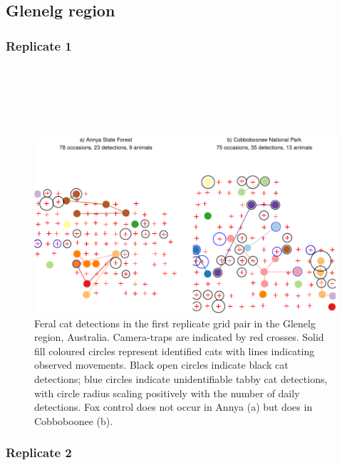 \documentclass[11pt,a4paper,titlepage,twoside,openright]{style/unimelbthesis}
\begin{document}
\begin{mainmatter}
\hypertarget{glenelg-region}{%
\subsection{Glenelg region}\label{glenelg-region}}

\hypertarget{replicate-1}{%
\subsubsection{Replicate 1}\label{replicate-1}}

\(~\)

\(~\)

\(~\)
\begin{figure}

{\centering \includegraphics[width=1\linewidth]{figure/density-plot-ch-1-1} 

}

\caption{Feral cat detections in the first replicate grid pair in the Glenelg region, Australia. Camera-traps are indicated by red crosses. Solid fill coloured circles represent identified cats with lines indicating observed movements. Black open circles indicate black cat detections; blue circles indicate unidentifiable tabby cat detections, with circle radius scaling positively with the number of daily detections. Fox control does not occur in Annya (a) but does in Cobboboonee (b).}\label{fig:density-plot-ch-1}
\end{figure}
\newpage

\hypertarget{replicate-2}{%
\subsubsection{Replicate 2}\label{replicate-2}}

\(~\)


\end{mainmatter}
\end{document}
